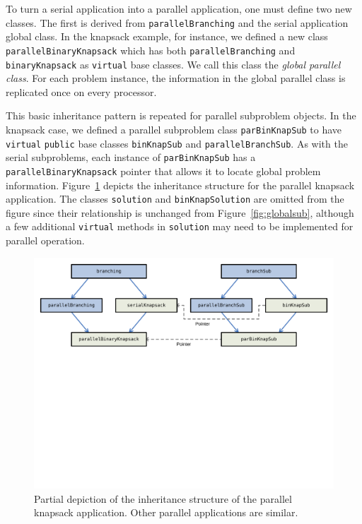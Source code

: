 To turn a serial application into a parallel application, one must
define two new classes.  The first is derived from
\texttt{parallelBranching} and the serial application global class.
In the knapsack example, for instance, we defined a new class
\texttt{parallelBinaryKnapsack} which has both
\texttt{parallelBranching} and \texttt{binaryKnapsack} as
\texttt{virtual} base classes.  We call this class the \emph{global
parallel class}.  For each problem instance, the information in the
global parallel class is replicated once on every processor.

This basic inheritance pattern is repeated for
parallel subproblem objects.  In the knapsack case, we defined a
parallel subproblem class \texttt{parBinKnapSub} to have
\texttt{virtual} \texttt{public} base classes \texttt{binKnapSub} and
\texttt{parallelBranchSub}.  As with the serial subproblems, each
instance of \texttt{parBinKnapSub} has a
\texttt{parallelBinaryKnapsack} pointer that allows it to locate
global problem information.  Figure~\ref{fig:parinherit} depicts the
inheritance structure for the parallel knapsack application.  The
classes \texttt{solution} and \texttt{binKnapSolution} are omitted
from the figure since their relationship is unchanged from
Figure~\ref{fig:globalsub}, although a few additional \texttt{virtual}
methods in \texttt{solution} may need
to be implemented for parallel operation.

\begin{figure}[tb]
\begin{center}
\includegraphics[width=\textwidth]{parinherit-new}
\vspace{-0.4in}
\end{center}
\caption{Partial depiction of the inheritance structure of the
  parallel knapsack application.  Other parallel applications are
  similar.}
\label{fig:parinherit}
\end{figure}

